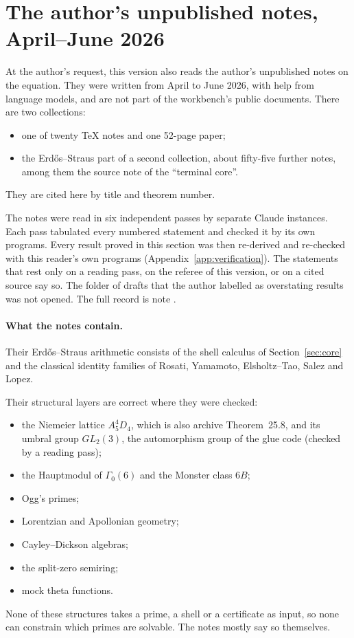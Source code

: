 \section{The author's unpublished notes, April--June 2026}\label{sec:notes}

At the author's request, this version also reads the author's unpublished notes on the equation. They were written from April to June 2026, with help from language models, and are not part of the workbench's public documents. There are two collections:
\begin{itemize}
\item one of twenty \TeX{} notes and one 52-page paper;
\item the Erdős--Straus part of a second collection, about fifty-five further notes, among them the source note of the ``terminal core''.
\end{itemize}
They are cited here by title and theorem number.

The notes were read in six independent passes by separate Claude instances. Each pass tabulated every numbered statement and checked it by its own programs. Every result proved in this section was then re-derived and re-checked with this reader's own programs (Appendix~\ref{app:verification}). The statements that rest only on a reading pass, on the referee of this version, or on a cited source say so. The folder of drafts that the author labelled as overstating results was not opened. The full record is note .

\paragraph{What the notes contain.}
Their Erdős--Straus arithmetic consists of the shell calculus of Section~\ref{sec:core} and the classical identity families of Rosati, Yamamoto, Elsholtz--Tao, Salez and Lopez.

Their structural layers are correct where they were checked:
\begin{itemize}
\item the Niemeier lattice $A_5^4D_4$, which is also archive Theorem~25.8, and its umbral group $GL_2(3)$, the automorphism group of the glue code (checked by a reading pass);
\item the Hauptmodul of $\Gamma_0(6)$ and the Monster class $6B$;
\item Ogg's primes;
\item Lorentzian and Apollonian geometry;
\item Cayley--Dickson algebras;
\item the split-zero semiring;
\item mock theta functions.
\end{itemize}
None of these structures takes a prime, a shell or a certificate as input, so none can constrain which primes are solvable. The notes mostly say so themselves.


